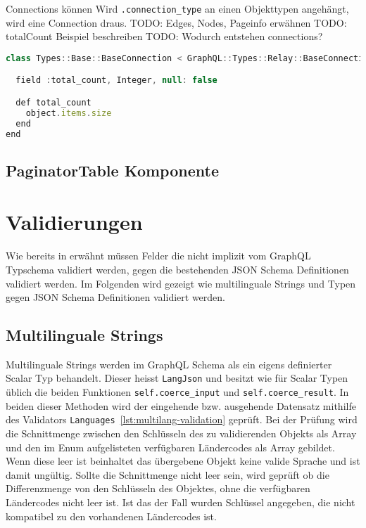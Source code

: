 Connections können 
Wird \lstinline|.connection_type| an einen Objekttypen angehängt, wird eine Connection draus. 
TODO: Edges, Nodes, Pageinfo erwähnen
TODO: totalCount Beispiel beschreiben
TODO: Wodurch entstehen connections?
\begin{lstlisting}[language=JavaScript,float=h!,caption={Generierter Aufruf der gql-Funktion erhält Querystring als Parameter}, label={lst:example:service}]
class Types::Base::BaseConnection < GraphQL::Types::Relay::BaseConnection

  field :total_count, Integer, null: false

  def total_count
    object.items.size
  end
end
\end{lstlisting}

\subsection{PaginatorTable Komponente}
\label{impl:paginator-component}


\section{Validierungen}
\label{graphql:validation}
Wie bereits in  erwähnt müssen Felder die nicht implizit vom GraphQL Typschema validiert werden, gegen die bestehenden JSON Schema Definitionen validiert werden. Im Folgenden wird gezeigt wie multilinguale Strings und Typen gegen JSON Schema Definitionen validiert werden.

\subsection{Multilinguale Strings}
\label{graphql:validation:multi}
Multilinguale Strings werden im GraphQL Schema als ein eigens definierter Scalar Typ behandelt.
Dieser heisst \lstinline|LangJson| und besitzt wie für Scalar Typen üblich die beiden Funktionen \lstinline|self.coerce_input| und \lstinline|self.coerce_result|. In beiden dieser Methoden wird der eingehende bzw. ausgehende Datensatz mithilfe des Validators \lstinline|Languages|~\ref{lst:multilang-validation} geprüft. 
Bei der Prüfung wird die Schnittmenge zwischen den Schlüsseln des zu validierenden Objekts als Array und den im Enum aufgelisteten verfügbaren Ländercodes als Array gebildet. Wenn diese leer ist beinhaltet das übergebene Objekt keine valide Sprache und ist damit ungültig. Sollte die Schnittmenge nicht leer sein, wird geprüft ob die Differenzmenge von den Schlüsseln des Objektes, ohne die verfügbaren Ländercodes nicht leer ist. Ist das der Fall wurden Schlüssel angegeben, die nicht kompatibel zu den vorhandenen Ländercodes ist. 

